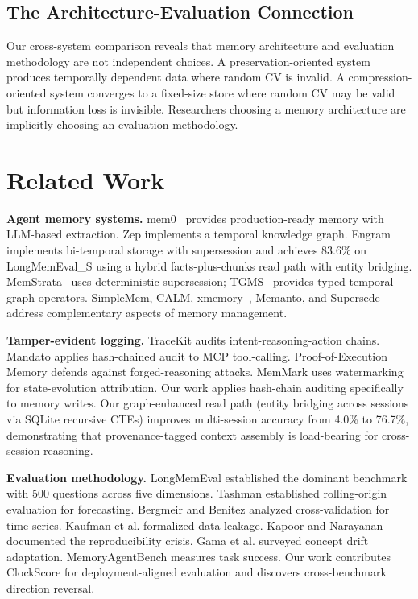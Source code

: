 \documentclass{llncs}
\begin{document}
\subsection{The Architecture-Evaluation Connection}
Our cross-system comparison reveals that memory architecture and evaluation methodology are not independent choices. A preservation-oriented system produces temporally dependent data where random CV is invalid. A compression-oriented system converges to a fixed-size store where random CV may be valid but information loss is invisible. Researchers choosing a memory architecture are implicitly choosing an evaluation methodology.


\section{Related Work}


\textbf{Agent memory systems.} mem0~\cite{mem0} provides production-ready memory with LLM-based extraction. Zep implements a temporal knowledge graph. Engram~\cite{engram} implements bi-temporal storage with supersession and achieves 83.6\% on LongMemEval\_S using a hybrid facts-plus-chunks read path with entity bridging. MemStrata~\cite{memstrata} uses deterministic supersession; TGMS~\cite{tgms} provides typed temporal graph operators. SimpleMem, CALM, xmemory~\cite{xmemory}, Memanto, and Supersede address complementary aspects of memory management.

\textbf{Tamper-evident logging.} TraceKit audits intent-reasoning-action chains. Mandato applies hash-chained audit to MCP tool-calling. Proof-of-Execution Memory defends against forged-reasoning attacks. MemMark uses watermarking for state-evolution attribution. Our work applies hash-chain auditing specifically to memory writes. Our graph-enhanced read path (entity bridging across sessions via SQLite recursive CTEs) improves multi-session accuracy from 4.0\% to 76.7\%, demonstrating that provenance-tagged context assembly is load-bearing for cross-session reasoning.

\textbf{Evaluation methodology.} LongMemEval established the dominant benchmark with 500 questions across five dimensions. Tashman established rolling-origin evaluation for forecasting. Bergmeir and Benitez analyzed cross-validation for time series. Kaufman et al. formalized data leakage. Kapoor and Narayanan documented the reproducibility crisis. Gama et al. surveyed concept drift adaptation. MemoryAgentBench measures task success. Our work contributes ClockScore for deployment-aligned evaluation and discovers cross-benchmark direction reversal.
\end{document}
